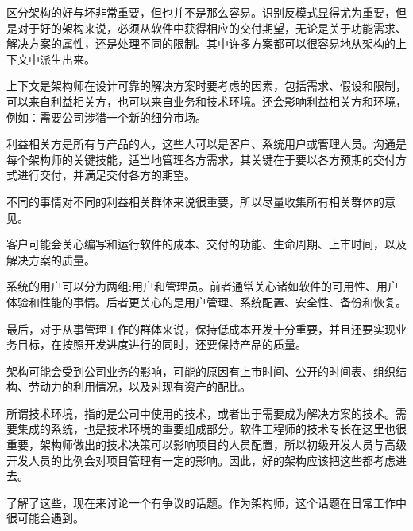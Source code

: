 
区分架构的好与坏非常重要，但也并不是那么容易。识别反模式显得尤为重要，但是对于好的架构来说，必须从软件中获得相应的交付期望，无论是关于功能需求、解决方案的属性，还是处理不同的限制。其中许多方案都可以很容易地从架构的上下文中派生出来。


上下文是架构师在设计可靠的解决方案时要考虑的因素，包括需求、假设和限制，可以来自利益相关方，也可以来自业务和技术环境。还会影响利益相关方和环境，例如：需要公司涉猎一个新的细分市场。


利益相关方是所有与产品的人，这些人可以是客户、系统用户或管理人员。沟通是每个架构师的关键技能，适当地管理各方需求，其关键在于要以各方预期的交付方式进行交付，并满足交付各方的期望。

不同的事情对不同的利益相关群体来说很重要，所以尽量收集所有相关群体的意见。

客户可能会关心编写和运行软件的成本、交付的功能、生命周期、上市时间，以及解决方案的质量。

系统的用户可以分为两组:用户和管理员。前者通常关心诸如软件的可用性、用户体验和性能的事情。后者更关心的是用户管理、系统配置、安全性、备份和恢复。

最后，对于从事管理工作的群体来说，保持低成本开发十分重要，并且还要实现业务目标，在按照开发进度进行的同时，还要保持产品的质量。



架构可能会受到公司业务的影响，可能的原因有上市时间、公开的时间表、组织结构、劳动力的利用情况，以及对现有资产的配比。

所谓技术环境，指的是公司中使用的技术，或者出于需要成为解决方案的技术。需要集成的系统，也是技术环境的重要组成部分。软件工程师的技术专长在这里也很重要，架构师做出的技术决策可以影响项目的人员配置，所以初级开发人员与高级开发人员的比例会对项目管理有一定的影响。因此，好的架构应该把这些都考虑进去。

了解了这些，现在来讨论一个有争议的话题。作为架构师，这个话题在日常工作中很可能会遇到。















